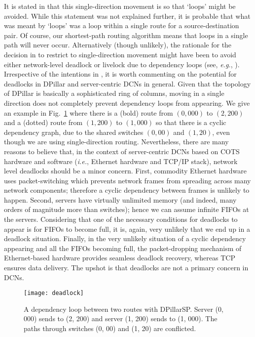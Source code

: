 \documentclass{article}
\newcounter{fig}
\begin{document}
It is stated in \cite[Section 3.1]{LYY12} that this single-direction movement is so that `loops' might be avoided. While this statement was not explained further, it is probable that what was meant by `loops' was a loop within a single route for a source-destination pair. Of course, our shortest-path routing algorithm means that loops in a single path will never occur. Alternatively (though unlikely), the rationale for the decision in \cite{LYY12} to restrict to single-direction movement might have been to avoid either network-level deadlock or livelock due to dependency loops (see, \emph{e.g.}, \cite[Ch. 14]{DT04}). Irrespective of the intentions in \cite{LYY12}, it is worth commenting on the potential for deadlocks in DPillar and server-centric DCNs in general. Given that the topology of DPillar is basically a sophisticated ring of columns, moving in a single direction does not completely prevent dependency loops from appearing. We give an example in Fig.~\ref{deadlock} where there is a (bold) route from $(0,000)$ to $(2,200)$ and a (dotted) route from $(1,200)$ to $(1,000)$ so that there is a cyclic dependency graph, due to the shared switches $(0,00)$ and $(1,20)$, even though we are using single-direction routing.  Nevertheless, there are many reasons to believe that, in the context of server-centric DCNs based on COTS hardware and software (\emph{i.e.}, Ethernet hardware and TCP/IP stack), network level deadlocks should be a minor concern. First, commodity Ethernet hardware uses packet-switching which prevents network frames from spreading across many network components; therefore a cyclic dependency between frames is unlikely to happen. Second, servers have virtually unlimited memory (and indeed, many orders of magnitude more than switches); hence we can assume infinite FIFOs at the servers. Considering that one of the necessary conditions for deadlocks to appear is for FIFOs to become full, it is, again, very unlikely that we end up in a deadlock situation. Finally, in the very unlikely situation of a cyclic dependency appearing and all the FIFOs becoming full, the packet-dropping mechanism of Ethernet-based hardware provides seamless deadlock recovery, whereas TCP ensures data delivery. The upshot is that deadlocks are not a primary concern in DCNs.

\begin{figure}[htb]
	\centering
		\texttt{[image: deadlock]}
	\caption{A dependency loop between two routes with DPillarSP. Server (0, 000) sends to (2, 200) and server (1, 200) sends to (1, 000). The paths through switches (0, 00) and (1, 20) are conflicted.}
	\label{deadlock}
\end{figure}
\end{document}
